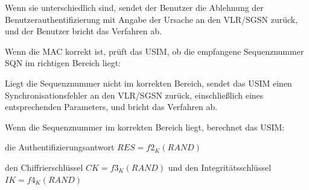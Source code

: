 \documentclass[a4paper]{article}
\begin{document}
\begin{multicols}{3}
\begin{itemize*}
\begin{itemize*}
                  \item Wenn sie unterschiedlich sind, sendet der Benutzer die Ablehnung der Benutzerauthentifizierung mit Angabe der Ursache an den VLR/SGSN zurück, und der Benutzer bricht das Verfahren ab.
                  \item Wenn die MAC korrekt ist, prüft das USIM, ob die empfangene Sequenznummer SQN im richtigen Bereich liegt:
                  \begin{itemize*}
                        \item Liegt die Sequenznummer nicht im korrekten Bereich, sendet das USIM einen Synchronisationsfehler an den VLR/SGSN zurück, einschließlich eines entsprechenden Parameters, und bricht das Verfahren ab.
                  \end{itemize*}
                  \item Wenn die Sequenznummer im korrekten Bereich liegt, berechnet das USIM:
                  \begin{itemize*}
                        \item die Authentifizierungsantwort $RES = f2_K(RAND)$
                        \item den Chiffrierschlüssel $CK = f3_K(RAND)$ und den Integritätsschlüssel $IK = f4_K(RAND)$
                  \end{itemize*}
            \end{itemize*}
      \end{itemize*}


\end{multicols}
\end{document}
